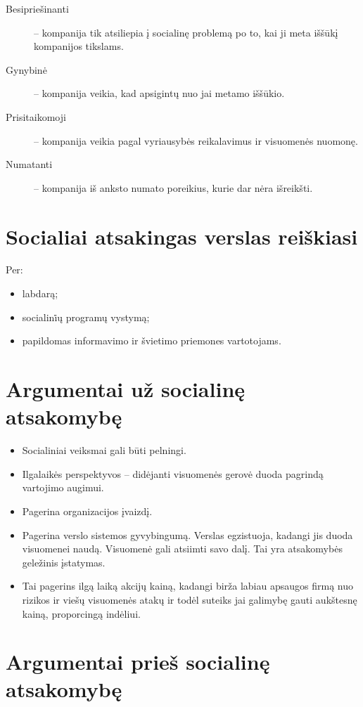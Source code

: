\begin{description}
  \item[Besipriešinanti] – kompanija tik atsiliepia į socialinę problemą
    po to, kai ji meta iššūkį kompanijos tikslams.
  \item[Gynybinė] – kompanija veikia, kad apsigintų nuo jai metamo
    iššūkio.
  \item[Prisitaikomoji] – kompanija veikia pagal vyriausybės reikalavimus
    ir visuomenės nuomonę.
  \item[Numatanti] – kompanija iš anksto numato poreikius, kurie dar nėra
    išreikšti.
\end{description}

\section{Socialiai atsakingas verslas reiškiasi}

Per:
\begin{itemize}
  \item labdarą;
  \item socialini̇ų programų vystymą;
  \item papildomas informavimo ir švietimo priemones vartotojams.
\end{itemize}

\section{Argumentai už socialinę atsakomybę}

\begin{itemize}
  \item Socialiniai veiksmai gali būti pelningi.
  \item Ilgalaikės perspektyvos – didėjanti visuomenės gerovė duoda
    pagrindą vartojimo augimui.
  \item Pagerina organizacijos įvaizdį.
  \item Pagerina verslo sistemos gyvybingumą. Verslas egzistuoja,
    kadangi jis duoda visuomenei naudą. Visuomenė gali atsiimti savo
    dalį. Tai yra atsakomybės geležinis įstatymas.
  \item Tai pagerins ilgą laiką akcijų kainą, kadangi birža labiau
    apsaugos firmą nuo rizikos ir viešų visuomenės atakų ir todėl
    suteiks jai galimybę gauti aukštesnę kainą, proporcingą indėliui.
\end{itemize}

\section{Argumentai prieš socialinę atsakomybę}

